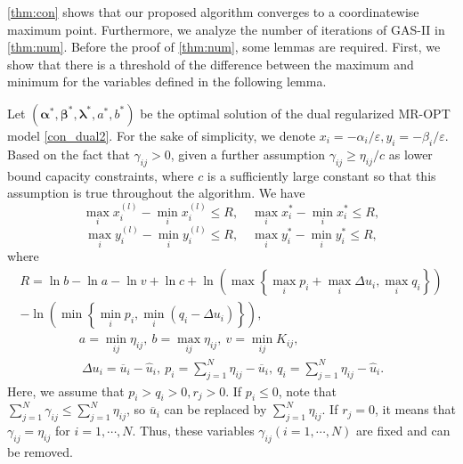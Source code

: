\documentclass[review,hidelinks,onefignum,onetabnum]{siamart220329}
\begin{document}
\cref{thm:con} shows that our proposed algorithm converges to a coordinatewise maximum point. Furthermore, we analyze the number of iterations of GAS-II in \cref{thm:num}.
Before the proof of \cref{thm:num}, some lemmas are required. First, we show that there is a threshold of the difference between the maximum and minimum for the variables defined in the following lemma. 
\begin{lemma}\label{lemma:R}
    Let $(\bm{\alpha}^{*},\bm{\beta}^{*},\bm{\lambda}^{*},a^{*},b^{*})$ be the optimal solution of the dual regularized MR-OPT model \cref{con_dual2}. 
    For the sake of simplicity, we denote $x_i =-\alpha_i / \varepsilon, y_i =-\beta_i / \varepsilon$.
    Based on the fact that $\gamma_{ij}>0$,  given a further assumption $\gamma_{ij}\geq \eta_{ij} / c$ as lower bound capacity constraints, where $c$ is a sufficiently large constant so that this assumption is true throughout the algorithm. We have
 $$\max_{i} x^{(l)}_i-\min_{i} x^{(l)}_i\leq R, \quad \max_{i} x^{*}_i-\min_{i} x^{*}_i\leq R,$$
 $$\max_{i} y^{(l)}_i-\min_{i} y^{(l)}_i\leq R, \quad \max_{i} y^{*}_i-\min_{i} y^{*}_i\leq R,$$
 where
  \begin{multline*}
     R= \ln b -\ln a-\ln v +\ln c + \ln\left(\max\left\{\max_{i} p_i+\max_i \Delta u_i, \max_i q_i\right\}\right) \\
     -\ln\left(\min\left\{\min_{i} p_i,\min_i(q_i-\Delta u_i)\right\}\right), 
 \end{multline*}
 \begin{gather*}
     a=\min_{ij} \eta_{ij}, \  b=\max_{ij} \eta_{ij}, \ v=\min_{ij} K_{ij},\\
     \ \Delta u_i=\overline{u}_i-\hat{u}_i, \
     p_i=\sum_{j=1}^{N}\eta_{ij}-\overline{u}_i, \ q_i=\sum_{j=1}^{N}\eta_{ij}-\hat{u}_i. 
 \end{gather*}
 Here, we assume that $p_i > q_i > 0, r_j>0$. If $p_i \leq 0$, note that $\sum_{j=1}^{N}\gamma_{ij}\leq \sum_{j=1}^{N}\eta_{ij}$, so $\overline{u}_i$ can be replaced by $\sum_{j=1}^{N}\eta_{ij}$. If $r_j = 0$, it means that $\gamma_{ij} = \eta_{ij}$ for $i= 1,\cdots,N$. Thus, these variables $\gamma_{ij} (i=1,\cdots,N)$ are fixed and can be removed. 
 
\end{lemma}
\end{document}
